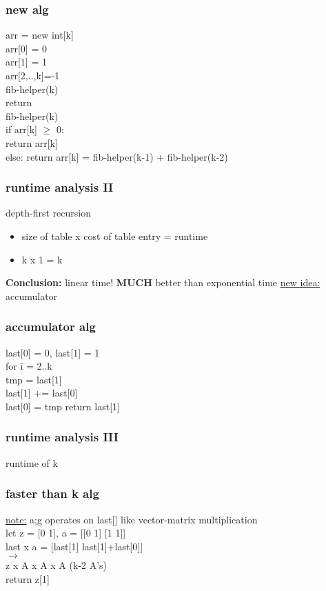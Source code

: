 \documentclass[a4paper]{article}
\newcommand{\ra}{$\rightarrow$}
\begin{document}
      \subsubsection{new alg}
        arr = new int[k]\\
        arr[0] = 0\\
        arr[1] = 1\\
        arr[2,..,k]=-1\\
        fib-helper(k)\\
        return\\
        fib-helper(k){\\
        if arr[k] $\ge$ 0: {\\
        return arr[k]}\\
        else: return arr[k] = fib-helper(k-1) + fib-helper(k-2)\\
        }
      \subsubsection{runtime analysis II}
        depth-first recursion\\
        \begin{itemize}
          \item[] size of table x cost of table entry = runtime
          \item[] k x 1 = k
        \end{itemize}
        \textbf{Conclusion:} linear time! \textbf{MUCH} better than exponential time
        \underline{new idea:} accumulator
      \subsubsection{accumulator alg}
        \begin{tabbing}
          last[0] = 0, last[1] = 1\\
          for \= i = 2..k\\
          \> tmp = last[1]\\
          \> last[1] += last[0]\\
          \> last[0] = tmp
        return last[1]
        \end{tabbing}
      \subsubsection{runtime analysis III}
        runtime of k
      \subsubsection{faster than k alg}
        \underline{note:} a;g operates on last[] like vector-matrix multiplication\\
        let z = [0 1], a = [[0 1] [1 1]]\\
        last x a = [last[1] last[1]+last[0]]\\
        \ra \\
        z x A x A x A (k-2 A's)\\
        return z[1]\\
\end{document}
